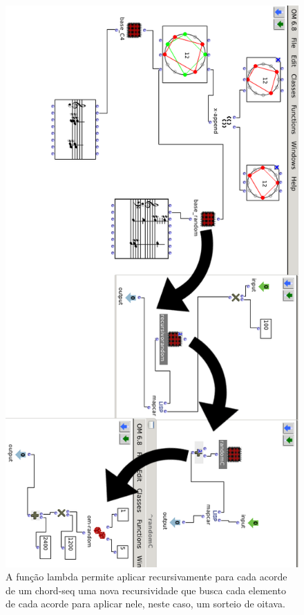 \documentclass[
	12pt,				%
	openright,			%
	twoside,			%
	a4paper,			%
	english,			%
	french,				%
	spanish,			%
	brazil				%
	]{abntex2}
\begin{document}
\begin{figure}[!h]
	\caption{\label{fig_grafico}A função lambda permite aplicar recursivamente para cada acorde de um chord-seq uma nova recursividade que busca cada elemento de cada acorde para aplicar nele, neste caso, um sorteio de oitava. }
	\begin{center}
	    \includegraphics[scale=0.5]{OMPD/Lambda_randomOitavas.png}
	\end{center}
\end{figure}
\end{document}

